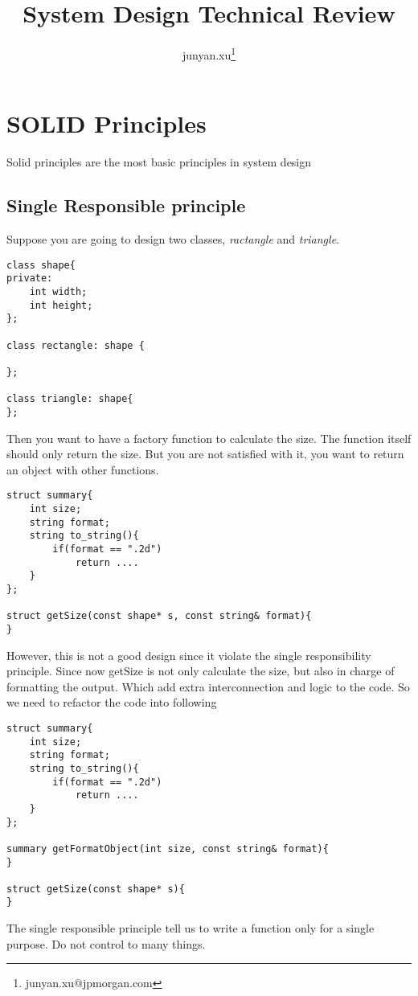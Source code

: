 \documentclass[11pt, oneside]{article}   	%
\title{System Design Technical Review}
\author{junyan.xu\footnote{junyan.xu@jpmorgan.com}}
\begin{document}
\maketitle

\tableofcontents

\newpage

\section{SOLID Principles}
Solid principles are the most basic principles in system design

\subsection{Single Responsible principle}
Suppose you are going to design two classes, \textit{ractangle} and \textit{triangle}. 

\begin{lstlisting}
class shape{
private:
	int width;
	int height;
};

class rectangle: shape {

};

class triangle: shape{
};
\end{lstlisting}

Then you want to have a factory function to calculate the size. The function itself should only return the size. But you are not satisfied with it, you want to return an object with other functions.
\begin{lstlisting}
struct summary{
	int size;
	string format;
	string to_string(){
		if(format == ".2d")
			return ....
	}
};

struct getSize(const shape* s, const string& format){
}
\end{lstlisting}

However, this is not a good design since it violate the single responsibility principle. Since now getSize is not only calculate the size, but also in charge of formatting the output. 
Which add extra interconnection and logic to the code. So we need to refactor the code into following
\begin{lstlisting}
struct summary{
	int size;
	string format;
	string to_string(){
		if(format == ".2d")
			return ....
	}
};

summary getFormatObject(int size, const string& format){
}

struct getSize(const shape* s){
}
\end{lstlisting}
The single responsible principle tell us to write a function only for a single purpose. Do not control to many things.
\end{document}

